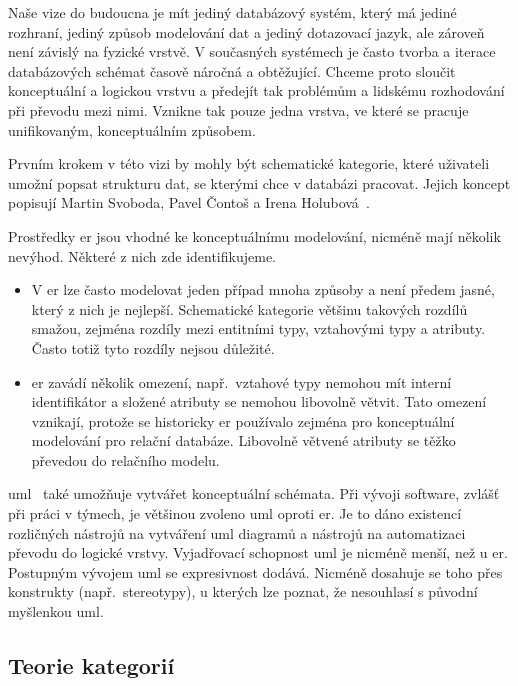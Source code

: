 Naše vize do budoucna je mít jediný databázový systém, který má jediné rozhraní, jediný způsob modelování dat a jediný dotazovací jazyk, ale zároveň není závislý na fyzické vrstvě.
V současných systémech je často tvorba a iterace databázových schémat časově náročná a obtěžující.
Chceme proto sloučit konceptuální a logickou vrstvu a předejít tak problémům a lidskému rozhodování při převodu mezi nimi.
Vznikne tak pouze jedna vrstva, ve které se pracuje unifikovaným, konceptuálním způsobem.

Prvním krokem v této vizi by mohly být schematické kategorie, které uživateli umožní popsat strukturu dat, se kterými chce v databázi pracovat.
Jejich koncept popisují Martin Svoboda, Pavel Čontoš a Irena Holubová~\cite{svoboda_categorical_2021}.

Prostředky \acrshort{er} jsou vhodné ke konceptuálnímu modelování, nicméně mají několik nevýhod.
Některé z nich zde identifikujeme.
\begin{itemize}
  \item V \acrshort{er} lze často modelovat jeden případ mnoha způsoby a není předem jasné, který z nich je nejlepší.
        Schematické kategorie většinu takových rozdílů smažou, zejména rozdíly mezi entitními typy, vztahovými typy a atributy.
        Často totiž tyto rozdíly nejsou důležité.
  \item \acrshort{er} zavádí několik omezení, např.~vztahové typy nemohou mít interní identifikátor a složené atributy se nemohou libovolně větvit.
        Tato omezení vznikají, protože se historicky \acrshort{er} používalo zejména pro konceptuální modelování pro relační databáze.
        Libovolně větvené atributy se těžko převedou do relačního modelu.
\end{itemize}

\acrfull{uml}~\cite{omg_uml_2017} také umožňuje vytvářet konceptuální schémata.
Při vývoji software, zvlášť při práci v týmech, je většinou zvoleno \acrshort{uml} oproti \acrshort{er}.
Je to dáno existencí rozličných nástrojů na vytváření \acrshort{uml} diagramů a nástrojů na automatizaci převodu do logické vrstvy.
Vyjadřovací schopnost \acrshort{uml} je nicméně menší, než u \acrshort{er}.
Postupným vývojem \acrshort{uml} se expresivnost dodává.
Nicméně dosahuje se toho přes konstrukty (např.~stereotypy), u kterých lze poznat, že nesouhlasí s původní myšlenkou \acrshort{uml}.

\subsection{Teorie kategorií}

